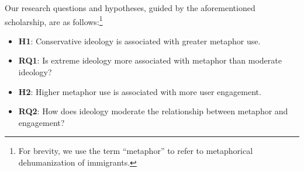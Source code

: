Our research questions and hypotheses, guided by the aforementioned scholarship, are as follows:\footnote{%
For brevity, we use the term ``metaphor'' to refer to metaphorical dehumanization of immigrants. }
 \begin{itemize}[noitemsep,topsep=0pt]
    \item \textbf{H1}: Conservative ideology is associated with greater metaphor use.
    \item \textbf{RQ1}: Is extreme ideology more associated with metaphor than moderate ideology? 
    \item \textbf{H2}: Higher metaphor use is associated with more user engagement.
    \item \textbf{RQ2}: How does ideology moderate the relationship between metaphor and engagement?
\end{itemize}




